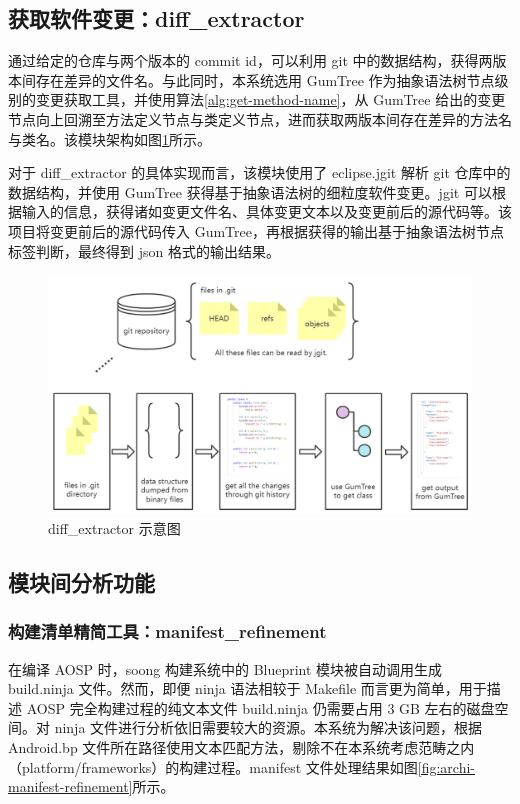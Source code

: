 \subsection{获取软件变更：diff\_extractor}

通过给定的仓库与两个版本的 commit id，可以利用 git 中的数据结构，获得两版本间存在差异的文件名。与此同时，本系统选用 GumTree 作为抽象语法树节点级别的变更获取工具，并使用算法\ref{alg:get-method-name}，从 GumTree 给出的变更节点向上回溯至方法定义节点与类定义节点，进而获取两版本间存在差异的方法名与类名。该模块架构如图\ref{fig:archi-diff-extractor}所示。

对于 diff\_extractor 的具体实现而言，该模块使用了 eclipse.jgit 解析 git 仓库中的数据结构，并使用 GumTree 获得基于抽象语法树的细粒度软件变更。jgit 可以根据输入的信息，获得诸如变更文件名、具体变更文本以及变更前后的源代码等。该项目将变更前后的源代码传入 GumTree，再根据获得的输出基于抽象语法树节点标签判断，最终得到 json 格式的输出结果。

\begin{figure}
    \centering
    \includegraphics[width=.8\textwidth]{figures/archi-diff-extractor.png}
    \caption{diff\_extractor 示意图}
    \label{fig:archi-diff-extractor}
\end{figure}

\subsection{模块间分析功能}

\subsubsection{构建清单精简工具：manifest\_refinement}

在编译 AOSP 时，soong 构建系统中的 Blueprint 模块被自动调用生成 build.ninja 文件。然而，即便 ninja 语法相较于 Makefile 而言更为简单，用于描述 AOSP 完全构建过程的纯文本文件 build.ninja 仍需要占用 3 GB 左右的磁盘空间。对 ninja 文件进行分析依旧需要较大的资源。本系统为解决该问题，根据 Android.bp 文件所在路径使用文本匹配方法，剔除不在本系统考虑范畴之内（platform/frameworks）的构建过程。manifest 文件处理结果如图\ref{fig:archi-manifest-refinement}所示。

